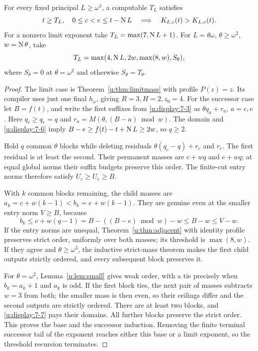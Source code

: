 \begin{theorem}\label{u:thm:mass}
For every fixed principal $L\ge\omega^3$, a computable $T_L$ satisfies
\begin{equation}
 t\ge T_L,\quad0\le c<e\le t-\operatorname{N} L
                 \quad\Longrightarrow\quad K_{L,c}(t)>K_{L,e}(t). \label{u:display:7-5}
\end{equation}
For a nonzero limit exponent take $T_L=\max(7,\operatorname{N} L+1)$.
For $L=\theta\omega$, $\theta\ge\omega^2$, $w=\operatorname{N}\theta$, take
\begin{equation}
 T_L=\max(4,\operatorname{N} L,2w,\max(8,w),S_\theta),          \label{u:display:7-6}
\end{equation}
where $S_\theta=0$ at $\theta=\omega^2$ and otherwise $S_\theta=T_\theta$.
\end{theorem}
\begin{proof}
The limit case is Theorem~\ref{u:thm:limitmass} with profile $P(z)=z$.
Its compiler uses just one final $h_\omega$, giving $R=3,H=2,z_0=4$.
For the successor case let $B=f(t)$, and write the first suffixes from
\eqref{u:display:7-3} as $\theta q_a+r_a$, $a=c,e$. Here $q_c\ge q_e=q$ and
$r_a=M(\theta,(B-a)\bmod w)$. The domain and \eqref{u:display:7-6} imply
$B-e\ge f(t)-t+\operatorname{N} L\ge2w$, so $q\ge2$.

Hold $q$ common $\theta$ blocks while deleting residuals
$\theta(q_c-q)+r_c$ and $r_e$. The first residual is at least the
second. Their permanent masses are $c+wq$ and $e+wq$; at equal global
norms their suffix budgets preserve this order. The finite-cut entry
norms therefore satisfy $U_c\ge U_e\ge B$.

With $k$ common blocks remaining, the child masses are
$a_k=c+w(k-1)<b_k=e+w(k-1)$. They are genuine even at the smaller
entry norm $V\ge B$, because
\begin{equation}
 b_k\le e+w(q-1)=B-((B-e)\bmod w)-w\le B-w\le V-w. \label{u:display:7-7}
\end{equation}
If the entry norms are unequal, Theorem~\ref{u:thm:adjacent} with identity
profile preserves strict order, uniformly over both masses; its threshold
is $\max(8,w)$. If they agree and $\theta\ge\omega^3$, the inductive
strict-mass theorem makes the first child outputs strictly ordered, and
every subsequent block preserves it.

For $\theta=\omega^2$, Lemma~\ref{u:lem:small} gives weak order, with a
tie precisely when $b_k=a_k+1$ and $a_k$ is odd. If the first block ties,
the next pair of masses subtracts $w=3$ from both; the smaller mass is
then even, so their ceilings differ and the second outputs are strictly
ordered. There are at least two blocks, and \eqref{u:display:7-7} pays their domains.
All further blocks preserve the strict order. This proves the base and
the successor induction. Removing the finite terminal successor tail of
the exponent reaches either this base or a limit exponent, so the
threshold recursion terminates.
\end{proof}

